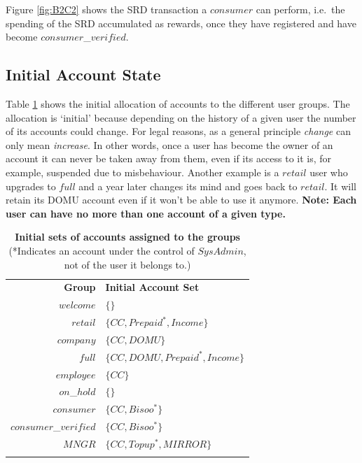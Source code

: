 Figure \ref{fig:B2C2} shows the SRD transaction a $consumer$ can perform, i.e.\ the spending of the SRD accumulated as rewards, once they have registered and have become $consumer$\_$verified$.

\subsection{Initial Account State}
Table \ref{tab:InitialAccountSets} shows the initial allocation of accounts to the different user groups. The allocation is `initial' because  depending on the history of a given user the number of its accounts could change. For legal reasons, as a general principle \emph{change} can only mean \emph{increase}. In other words, once a user has become the owner of an account it can never be taken away from them, even if its access to it is, for example, suspended due to misbehaviour. Another example is a $retail$ user who upgrades to $full$ and a year later changes its mind and goes back to $retail$. It will retain its DOMU account even if it won't be able to use it anymore. {\bf Note: Each user can have no more than one account of a given type.}

\begin{table}[h]
\begin{centering}
{
\begin{tabular}{ r | l  }
\textbf{Group}	& {\bf Initial Account Set} \\
\Xhline{1.5pt}
$welcome$	& $\{ \}$ \\
\hline
$retail$		& $\{ CC, Prepaid^*, Income \}$ \\
\hline
$company$	& $\{ CC, DOMU \}$ \\
\hline
$full$		& $\{ CC, DOMU, Prepaid^*, Income \}$ \\
\hline
$employee$	& $\{ CC \}$ \\
\hline
$on$\_$hold$	& $\{  \}$ \\
\hline
$consumer$	& $\{ CC, Bisoo^* \}$ \\
\hline
$consumer$\_$verified$ & $\{ CC, Bisoo^* \}$ \\
\hline
$MNGR$ 		& $\{ CC, Topup^*, MIRROR \}$ \\
\Xhline{1.5pt}
\end{tabular}
}
\caption{\small\textbf{Initial sets of accounts assigned to the groups}\\ (*Indicates an account under the control of $SysAdmin$, not of the user it belongs to.)}
\label{tab:InitialAccountSets}
\end{centering}
\end{table}


